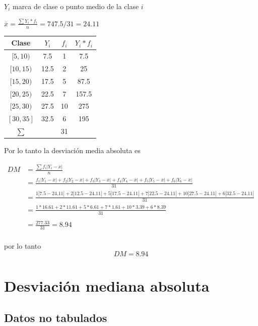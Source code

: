 \documentclass[
  11pt,
]{krantz}
\theoremstyle{definition}
\theoremstyle{definition}
\theoremstyle{definition}
\theoremstyle{definition}
\theoremstyle{remark}
\begin{document}
\(Y_i\) marca de clase o punto medio de la clase \(i\)

\(\overline{x}=\frac{\sum Y_i*f_i}{n}=747.5/31=24.11\)

\begin{longtable}[]{@{}cccc@{}}
\toprule
Clase & \(Y_i\) & \(f_i\) & \(Y_i*f_i\) \\
\midrule
\endhead
\([5,10)\) & 7.5 & 1 & 7.5 \\
\([10,15)\) & 12.5 & 2 & 25 \\
\([15,20)\) & 17.5 & 5 & 87.5 \\
\([20,25)\) & 22.5 & 7 & 157.5 \\
\([25,30)\) & 27.5 & 10 & 275 \\
\([30,35]\) & 32.5 & 6 & 195 \\
\(\sum\) & & 31 & \\
\bottomrule
\end{longtable}

Por lo tanto la desviación media absoluta es

\[
\begin{aligned}
DM&=\frac{\sum f_i\left \vert Y_i-\overline{x}\right \vert}{n}\\
&=\frac{f_1\left\vert Y_1-\overline{x}\right \vert +f_2\left\vert Y_2-\overline{x}\right \vert +f_3\left\vert Y_3-\overline{x}\right \vert +f_4\left\vert Y_4-\overline{x}\right \vert +f_5\left\vert Y_5-\overline{x}\right \vert +f_6\left\vert Y_6-\overline{x}\right \vert }{31}\\
&=\frac{1\left\vert 7.5-24.11\right \vert +2\left\vert 12.5-24.11\right \vert +5\left\vert 17.5-24.11\right \vert +7\left\vert 22.5-24.11\right \vert +10\left\vert 27.5-24.11\right \vert +6\left\vert 32.5-24.11\right \vert }{31}\\
&=\frac{1*16.61 +2*11.61 +5*6.61 +7*1.61 +10*3.39 +6*8.39 }{31}\\
\\
&=\frac{277.33}{31}=8.94\\
\end{aligned}
\]

por lo tanto \[DM=8.94\]

\hypertarget{desviaciuxf3n-mediana-absoluta}{%
\section{Desviación mediana absoluta}\label{desviaciuxf3n-mediana-absoluta}}

\hypertarget{datos-no-tabulados-2}{%
\subsection{Datos no tabulados}\label{datos-no-tabulados-2}}
\end{document}
